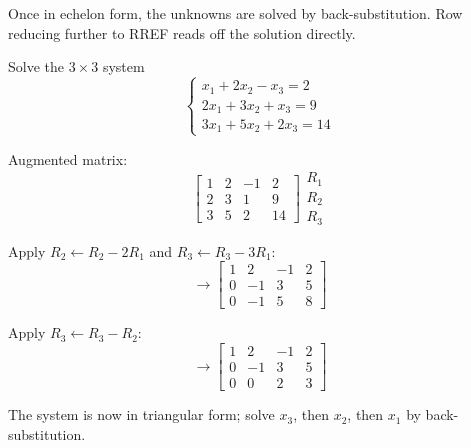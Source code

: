 Once in echelon form, the unknowns are solved by back-substitution. Row reducing further to RREF reads off the solution directly.

\begin{example}
  Solve the $3 \times 3$ system
  \[
    \begin{cases}
      x_1 + 2x_2 - x_3 = 2  \\
      2x_1 + 3x_2 + x_3 = 9 \\
      3x_1 + 5x_2 + 2x_3 = 14
    \end{cases}
  \]

  Augmented matrix:
  \[
    \left[
      \begin{array}{ccc|c}
        1 & 2 & -1 & 2  \\
        2 & 3 & 1  & 9  \\
        3 & 5 & 2  & 14
      \end{array}
      \right]
    \begin{matrix}
      R_1 \\ R_2 \\ R_3
    \end{matrix}
  \]

  Apply $R_2 \leftarrow R_2 - 2R_1$ and $R_3 \leftarrow R_3 - 3R_1$:
  \[
    \longrightarrow
    \left[
      \begin{array}{ccc|c}
        1 & 2  & -1 & 2 \\
        0 & -1 & 3  & 5 \\
        0 & -1 & 5  & 8
      \end{array}
      \right]
  \]

  Apply $R_3 \leftarrow R_3 - R_2$:
  \[
    \longrightarrow
    \left[
      \begin{array}{ccc|c}
        1 & 2  & -1 & 2 \\
        0 & -1 & 3  & 5 \\
        0 & 0  & 2  & 3
      \end{array}
      \right]
  \]

  The system is now in triangular form; solve $x_3$, then $x_2$, then $x_1$ by back-substitution.
\end{example}

